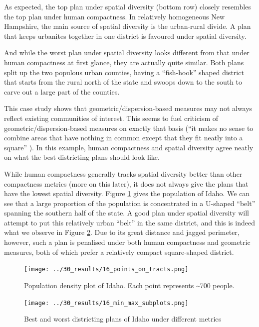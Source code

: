 \documentclass[]{article}
\begin{document}
As expected, the top plan under spatial diversity (bottom row) closely
resembles the top plan under human compactness. In relatively
homogeneous New Hampshire, the main source of spatial diversity is the
urban-rural divide. A plan that keeps urbanites together in one district
is favoured under spatial diversity.

And while the worst plan under spatial diversity looks different from
that under human compactness at first glance, they are actually quite
similar. Both plans split up the two populous urban counties, having a
``fish-hook'' shaped district that starts from the rural north of the
state and swoops down to the south to carve out a large part of the
counties.

This case study shows that geometric/dispersion-based measures may not
always reflect existing communities of interest. This seems to fuel
criticism of geometric/dispersion-based measures on exactly that basis
(``it makes no sense to combine areas that have nothing in common except
that they fit neatly into a square'' \citep{wolf2015}). In this example,
human compactness and spatial diversity agree neatly on what the best
districting plans should look like.

While human compactness generally tracks spatial diversity better than
other compactness metrics (more on this later), it does not always give
the plans that have the lowest spatial diversity. Figure
\ref{idaho_density} gives the population of Idaho. We can see that a
large proportion of the population is concentrated in a U-shaped
``belt'' spanning the southern half of the state. A good plan under
spatial diversity will attempt to put this relatively urban ``belt'' in
the same district, and this is indeed what we observe in Figure
\ref{idaho_minmax}. Due to its great distance and jagged perimeter,
however, such a plan is penalised under both human compactness and
geometric measures, both of which prefer a relatively compact
square-shaped district.

\begin{figure}
\centering
\texttt{[image: ../30\_results/16\_points\_on\_tracts.png]}
\caption{Population density plot of Idaho. Each point represents
\textasciitilde{}700 people. \label{idaho_density}}
\end{figure}

\begin{figure}
\centering
\texttt{[image: ../30\_results/16\_min\_max\_subplots.png]}
\caption{Best and worst districting plans of Idaho under different
metrics \label{idaho_minmax}}
\end{figure}
\end{document}
